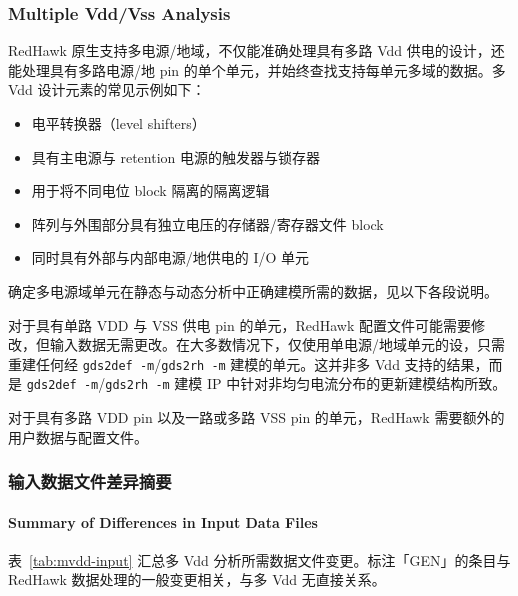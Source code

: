 \subsubsection*{Multiple Vdd/Vss Analysis}

RedHawk 原生支持多电源/地域，不仅能准确处理具有多路 Vdd 供电的设计，还能处理具有多路电源/地 pin 的单个单元，并始终查找支持每单元多域的数据。多 Vdd 设计元素的常见示例如下：
\begin{itemize}
  \item 电平转换器（level shifters）
  \item 具有主电源与 retention 电源的触发器与锁存器
  \item 用于将不同电位 block 隔离的隔离逻辑
  \item 阵列与外围部分具有独立电压的存储器/寄存器文件 block
  \item 同时具有外部与内部电源/地供电的 I/O 单元
\end{itemize}

确定多电源域单元在静态与动态分析中正确建模所需的数据，见以下各段说明。

对于具有单路 VDD 与 VSS 供电 pin 的单元，RedHawk 配置文件可能需要修改，但输入数据无需更改。在大多数情况下，仅使用单电源/地域单元的设，只需重建任何经 \texttt{gds2def -m}/\texttt{gds2rh -m} 建模的单元。这并非多 Vdd 支持的结果，而是 \texttt{gds2def -m}/\texttt{gds2rh -m} 建模 IP 中针对非均匀电流分布的更新建模结构所致。

对于具有多路 VDD pin 以及一路或多路 VSS pin 的单元，RedHawk 需要额外的用户数据与配置文件。

\subsubsection{输入数据文件差异摘要}
\paragraph*{Summary of Differences in Input Data Files}

表~\ref{tab:mvdd-input} 汇总多 Vdd 分析所需数据文件变更。标注「GEN」的条目与 RedHawk 数据处理的一般变更相关，与多 Vdd 无直接关系。

